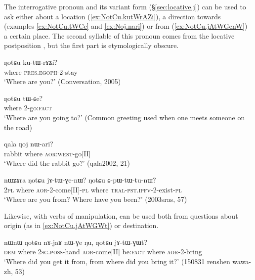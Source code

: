 The interrogative pronoun  and its variant form  (§\ref{sec:locative.j}) can be used to ask either about a location (\ref{ex:NotCu.kutWrAZi}), a direction towards (examples \ref{ex:NotCu.tWCe} and \ref{ex:Noj.nari}) or from (\ref{ex:NotCu.jAtWGenW}) a certain place. The second syllable of this pronoun  comes from the locative postposition , but the first part is etymologically obscure.
 
\begin{exe}
\ex \label{ex:NotCu.kutWrAZi}
\gll     ŋotɕu ku-tɯ-rɤʑi?   \\
  where \textsc{pres}.\textsc{egoph}-2-stay \\
\glt `Where are you?' (Conversation, 2005)
\end{exe} 

\begin{exe}
\ex \label{ex:NotCu.tWCe}
\gll   ŋotɕu tɯ-ɕe? \\
 where 2-go:\textsc{fact} \\
\glt `Where are you going to?' (Common greeting used when one meets someone on the road)
 \end{exe} 
 
\begin{exe}
\ex \label{ex:Noj.nari}
\gll     qala ŋoj nɯ-ari?  \\
  rabbit where \textsc{aor}:\textsc{west}-go[II] \\
\glt `Where did the rabbit go?'  (qala2002, 21)
\end{exe} 

\begin{exe}
\ex \label{ex:NotCu.jAtWGenW}
\gll  nɯʑɤra ŋotɕu jɤ-tɯ-ɣe-nɯ? ŋotɕu ɕ-pɯ-tɯ-tu-nɯ? \\
\textsc{2pl} where \textsc{aor}-2-come[II]-\textsc{pl} where \textsc{tral}-\textsc{pst}.\textsc{ipfv}-2-exist-\textsc{pl} \\
\glt `Where are you from? Where have you been?' (2003sras, 57)
\end{exe} 

Likewise, with verbs of manipulation,  can be used both from questions about origin (as in \ref{ex:NotCu.jAtWGWt}) or destination.

\begin{exe}
\ex \label{ex:NotCu.jAtWGWt}
\gll nɯnɯ ŋotɕu nɤ-jaʁ nɯ-ɣe ŋu, ŋotɕu jɤ-tɯ-ɣɯt? \\
\textsc{dem} where \textsc{2sg}.\textsc{poss}-hand \textsc{aor}-come[II] be:\textsc{fact} where \textsc{aor}-2-bring \\
\glt `Where did you get it from, from where did you bring it?' (150831 renshen wawa-zh, 53)
\end{exe} 

